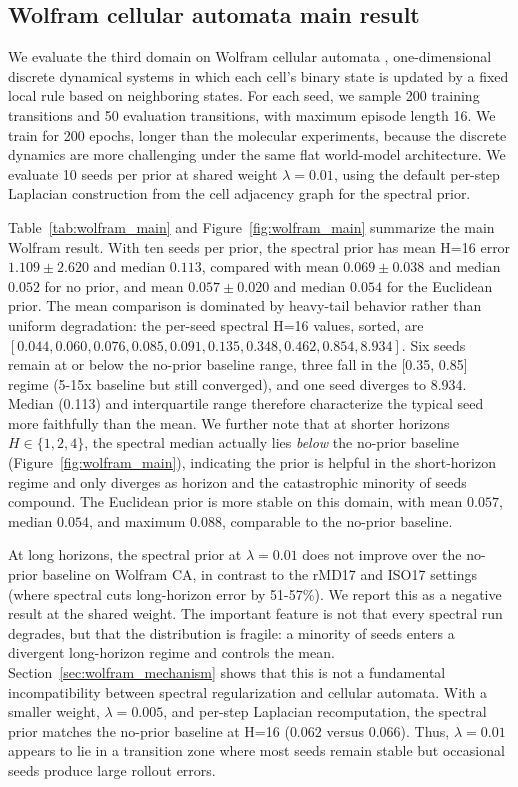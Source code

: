 \subsection{Wolfram cellular automata main result}\label{sec:wolfram}

We evaluate the third domain on Wolfram cellular automata \cite{wolfram2002}, one-dimensional discrete dynamical systems in which each cell's binary state is updated by a fixed local rule based on neighboring states. For each seed, we sample 200 training transitions and 50 evaluation transitions, with maximum episode length 16. We train for 200 epochs, longer than the molecular experiments, because the discrete dynamics are more challenging under the same flat world-model architecture. We evaluate 10 seeds per prior at shared weight \(\lambda=0.01\), using the default per-step Laplacian construction from the cell adjacency graph for the spectral prior.

Table~\ref{tab:wolfram_main} and Figure~\ref{fig:wolfram_main} summarize the main Wolfram result. With ten seeds per prior, the spectral prior has mean H=16 error \(1.109 \pm 2.620\) and median \(0.113\), compared with mean \(0.069 \pm 0.038\) and median \(0.052\) for no prior, and mean \(0.057 \pm 0.020\) and median \(0.054\) for the Euclidean prior. The mean comparison is dominated by heavy-tail behavior rather than uniform degradation: the per-seed spectral H=16 values, sorted, are \([0.044, 0.060, 0.076, 0.085, 0.091, 0.135, 0.348, 0.462, 0.854, 8.934]\). Six seeds remain at or below the no-prior baseline range, three fall in the [0.35, 0.85] regime (5-15x baseline but still converged), and one seed diverges to 8.934. Median (0.113) and interquartile range therefore characterize the typical seed more faithfully than the mean. We further note that at shorter horizons \(H \in \{1, 2, 4\}\), the spectral median actually lies \emph{below} the no-prior baseline (Figure~\ref{fig:wolfram_main}), indicating the prior is helpful in the short-horizon regime and only diverges as horizon and the catastrophic minority of seeds compound. The Euclidean prior is more stable on this domain, with mean \(0.057\), median \(0.054\), and maximum \(0.088\), comparable to the no-prior baseline.

At long horizons, the spectral prior at \(\lambda=0.01\) does not improve over the no-prior baseline on Wolfram CA, in contrast to the rMD17 and ISO17 settings (where spectral cuts long-horizon error by 51-57\%). We report this as a negative result at the shared weight. The important feature is not that every spectral run degrades, but that the distribution is fragile: a minority of seeds enters a divergent long-horizon regime and controls the mean. Section~\ref{sec:wolfram_mechanism} shows that this is not a fundamental incompatibility between spectral regularization and cellular automata. With a smaller weight, \(\lambda=0.005\), and per-step Laplacian recomputation, the spectral prior matches the no-prior baseline at H=16 (\(0.062\) versus \(0.066\)). Thus, \(\lambda=0.01\) appears to lie in a transition zone where most seeds remain stable but occasional seeds produce large rollout errors.

